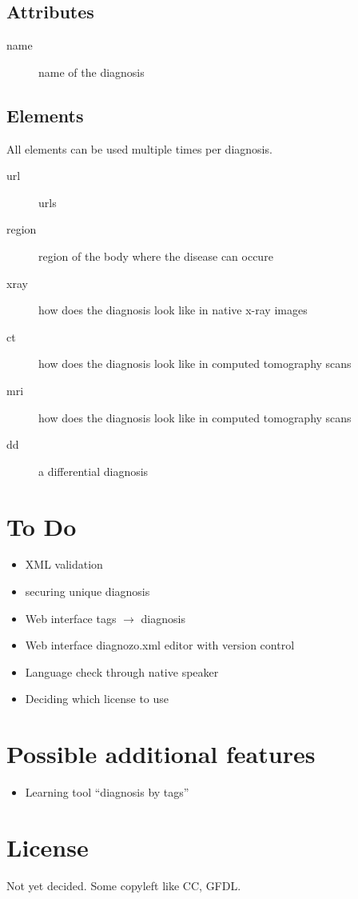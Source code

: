 \documentclass{article}
\begin{document}
\subsection{Attributes}

\begin{description}
	\item[name] name of the diagnosis
\end{description}

\subsection{Elements}
All elements can be used multiple times per diagnosis.

\begin{description}
	\item[url] urls
	\item[region] region of the body where the disease can occure
	\item[xray] how does the diagnosis look like in native x-ray images
	\item[ct] how does the diagnosis look like in computed tomography scans
	\item[mri] how does the diagnosis look like in computed tomography scans
	\item[dd] a differential diagnosis
\end{description}

\section{To Do}
\begin{itemize}
\item XML validation
\item securing unique diagnosis
\item Web interface tags $\rightarrow$ diagnosis
\item Web interface diagnozo.xml editor with version control
\item Language check through native speaker
\item Deciding which license to use
\end{itemize}

\section{Possible additional features}
\begin{itemize}
\item Learning tool ``diagnosis by tags''
\end{itemize}

\section{License}
Not yet decided. Some copyleft like CC, GFDL.
\end{document}
